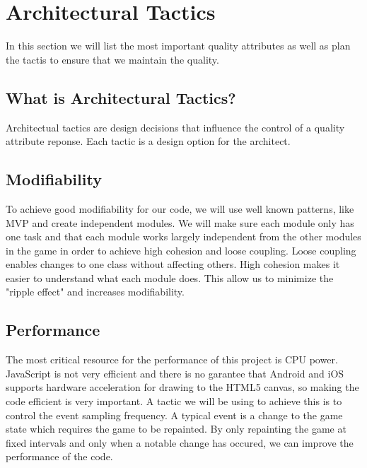 \section{Architectural Tactics}
In this section we will list the most important quality attributes as well as plan the tactis to 
ensure that we maintain the quality.

\subsection*{What is Architectural Tactics? }
Architectual tactics are design decisions that influence the control of a quality attribute reponse. 
Each tactic is a design option for the architect. \cite{architecturalTactics}

\subsection*{Modifiability}
To achieve good modifiability for our code, we will use well known patterns, like MVP and create 
independent modules. We will make sure each module only has one task and that each module works 
largely independent from the other modules in the game in order to achieve high cohesion and loose 
coupling. Loose coupling enables changes to one class without affecting others. High cohesion makes 
it easier to understand what each module does. This allow us to minimize the "ripple effect" and 
increases modifiability.

\subsection*{Performance}
The most critical resource for the performance of this project is CPU power. JavaScript is not very 
efficient and there is no garantee that Android and iOS supports hardware acceleration for drawing 
to the HTML5 canvas, so making the code efficient is very important. A tactic we will be using to 
achieve this is to control the event sampling frequency. A typical event is a change to the game 
state which requires the game to be repainted. By only repainting the game at fixed intervals and 
only when a notable change has occured, we can improve the performance of the code.

